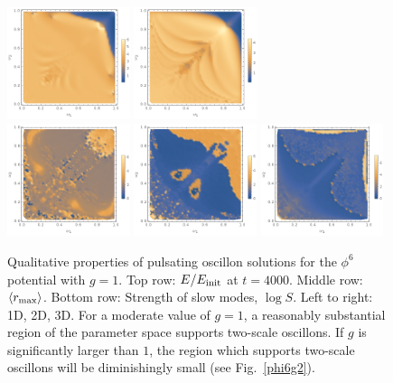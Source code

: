 \documentclass[%
reprint,
superscriptaddress,
amsmath,amssymb,
aps,
prd,
floatfix,
nofootinbib
]{revtex4-1}
\begin{document}
\begin{figure}
    \includegraphics[width=0.32\textwidth]{plot/r_max-phi6-2d.png}
    \includegraphics[width=0.32\textwidth]{plot/r_max-phi6-3d.png} \\
    \includegraphics[width=0.32\textwidth]{plot/slow-mode-logscale-phi6-1d.png}
    \includegraphics[width=0.32\textwidth]{plot/slow-mode-logscale-phi6-2d.png}
    \includegraphics[width=0.32\textwidth]{plot/slow-mode-logscale-phi6-3d.png}
    \caption{Qualitative properties of pulsating oscillon solutions for the $\phi^6$ potential with $g=1$. Top row: $E/E_{\rm init}$ at $t=4000$.
      Middle row: $\langle r_{\rm max}\rangle$.
      Bottom row: Strength of slow modes, $\log{S}$.\quad
      Left to right: 1D, 2D, 3D. \qquad For a moderate value of $g = 1$, a reasonably substantial region of the parameter space supports two-scale oscillons. If $g$ is significantly larger than $1$, the region which supports two-scale oscillons will be diminishingly small (see Fig.~\ref{phi6g2}).}\label{phi6}
\end{figure}
\end{document}
